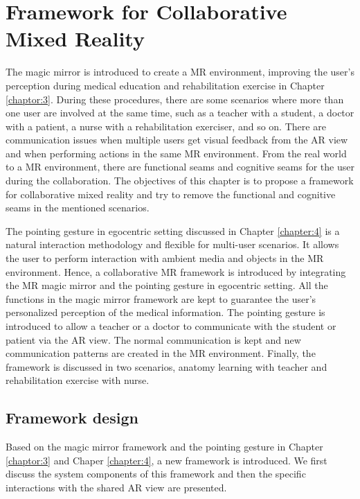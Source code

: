 \chapter{Framework for Collaborative Mixed Reality} \label{chaptor:5}
The magic mirror is introduced to create a MR environment, improving the user's perception during medical education and rehabilitation exercise in Chapter \ref{chaptor:3}. During these procedures, there are some scenarios where more than one user are involved at the same time, such as a teacher with a student, a doctor with a patient, a nurse with a rehabilitation exerciser, and so on. 
There are communication issues when multiple users get visual feedback from the AR view and when performing actions in the same MR environment. From the real world to a MR environment, there are functional seams and cognitive seams for the user during the collaboration.
The objectives of this chapter is to propose a framework for collaborative mixed reality and try to remove the functional and cognitive seams in the mentioned scenarios.

The pointing gesture in egocentric setting discussed in Chapter \ref{chapter:4} is a natural interaction methodology and flexible for multi-user scenarios. It allows the user to perform interaction with ambient media and objects in the MR environment. 
Hence, a collaborative MR framework is introduced by integrating the MR magic mirror and the pointing gesture in egocentric setting.
All the functions in the magic mirror framework are kept to guarantee the user's personalized perception of the medical information. The pointing gesture is introduced to allow a teacher or a doctor to communicate with the student or patient via the AR view.
The normal communication is kept and new communication patterns are created in the MR environment.
Finally, the framework is discussed in two scenarios, anatomy learning with teacher and rehabilitation exercise with nurse. 

\section{Framework design} %
Based on the magic mirror framework and the pointing gesture in Chapter \ref{chaptor:3} and Chaper \ref{chapter:4}, a new framework is introduced. 
We first discuss the system components of this framework and then the specific interactions with the shared AR view are presented.

